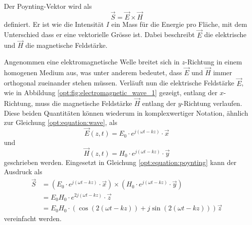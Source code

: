 Der Poynting-Vektor wird als
\begin{equation}
\vec{S} = \vec{E} \times \vec{H}
\label{opt:equation:poynting}
\end{equation}
definiert.
Er ist wie die Intensität $I$ ein Mass für die Energie pro Fläche, mit dem Unterschied dass er eine vektorielle Grösse ist.
Dabei beschreibt $\vec{E}$ die elektrische und $\vec{H}$ die magnetische Feldstärke.

Angenommen eine elektromagnetische Welle breitet sich in $z$-Richtung in einem homogenen Medium aus, was unter anderem bedeutet, dass $\vec{E}$ und $\vec{H}$ immer orthogonal zueinander stehen müssen.
Verläuft nun die elektrische Feldstärke $\vec{E}$, wie in Abbildung \ref{opt:fig:electromagnetic_wave_1} gezeigt, entlang der $x$-Richtung, muss die magnetische Feldstärke $\vec{H}$ entlang der $y$-Richtung verlaufen.
Diese beiden Quantitäten können wiederum in komplexwertiger Notation, ähnlich zur Gleichung \eqref{opt:equation:wave}, als
\begin{equation}
\vec{E}(z,t)
=
E_0 \cdot e^{j(\omega t-k z)} \cdot \vec{x}
\label{opt:equation:wave_electric_field}
\end{equation}
und
\begin{equation}
\vec{H}(z,t)
=
H_0 \cdot e^{j(\omega t-k z)} \cdot \vec{y}
\label{opt:equation:wave_magnetic_field}
\end{equation}
geschrieben werden.
Eingesetzt in Gleichung \eqref{opt:equation:poynting} kann der Ausdruck als
\begin{align*}
\vec{S}
&=
\left(E_0 \cdot e^{j(\omega t-k z)} \cdot \vec{x}\right) \times \left(H_0 \cdot e^{j(\omega t-k z)} \cdot \vec{y}\right)
\\
&=
E_0 H_0 \cdot e^{2j(\omega t-k z)} \cdot \vec{z}
\\
&=
E_0 H_0 \cdot \left(\cos{(2(\omega t-kz))}+j\sin{(2(\omega t-kz))}\right) \vec{z}
\end{align*}
vereinfacht werden.


